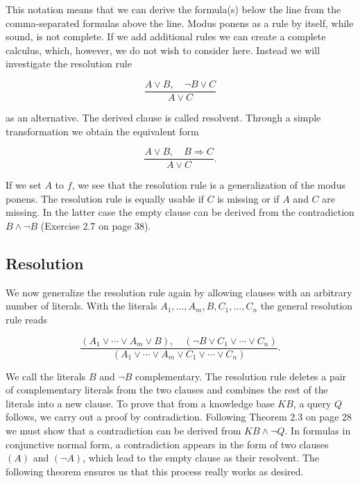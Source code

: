 \documentclass[10pt]{book}
\begin{document}
This notation means that we can derive the formula(s) below the line from the comma-separated formulas above the line. Modus ponens as a rule by itself, while sound, is not complete. If we add additional rules we can create a complete calculus, which, however, we do not wish to consider here. Instead we will investigate the resolution rule

\begin{equation*}
\frac{A \vee B, \quad \neg B \vee C}{A \vee C} \tag{2.1}
\end{equation*}

as an alternative. The derived clause is called resolvent. Through a simple transformation we obtain the equivalent form

$$
\frac{A \vee B, \quad B \Rightarrow C}{A \vee C} .
$$

If we set $A$ to $f$, we see that the resolution rule is a generalization of the modus ponens. The resolution rule is equally usable if $C$ is missing or if $A$ and $C$ are missing. In the latter case the empty clause can be derived from the contradiction $B \wedge \neg B$ (Exercise 2.7 on page 38).

\subsection{Resolution}
We now generalize the resolution rule again by allowing clauses with an arbitrary number of literals. With the literals $A_{1}, \ldots, A_{m}, B, C_{1}, \ldots, C_{n}$ the general resolution rule reads

\begin{equation*}
\frac{\left(A_{1} \vee \cdots \vee A_{m} \vee B\right), \quad\left(\neg B \vee C_{1} \vee \cdots \vee C_{n}\right)}{\left(A_{1} \vee \cdots \vee A_{m} \vee C_{1} \vee \cdots \vee C_{n}\right)} . \tag{2.2}
\end{equation*}

We call the literals $B$ and $\neg B$ complementary. The resolution rule deletes a pair of complementary literals from the two clauses and combines the rest of the literals into a new clause.
To prove that from a knowledge base $K B$, a query $Q$ follows, we carry out a proof by contradiction. Following Theorem 2.3 on page 28 we must show that a contradiction can be derived from $K B \wedge \neg Q$. In formulas in conjunctive normal form, a contradiction appears in the form of two clauses $(A)$ and $(\neg A)$, which lead to the empty clause as their resolvent. The following theorem ensures us that this process really works as desired.
\end{document}
